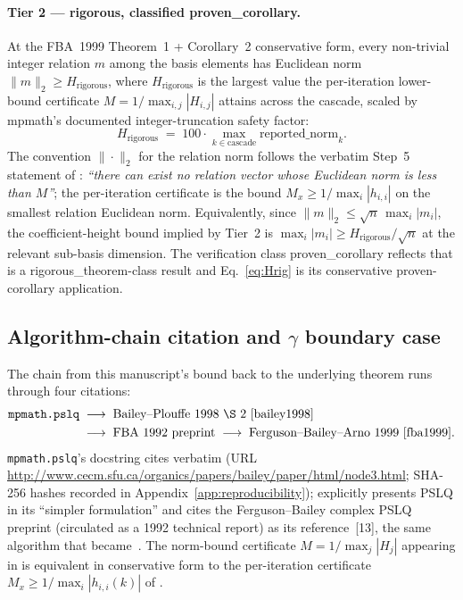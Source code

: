 \documentclass[11pt,a4paper]{article}
\newcommand{\Hrig}{H_{\mathrm{rigorous}}}
\newcommand{\pc}{\textsf{proven\_corollary}}
\newcommand{\rt}{\textsf{rigorous\_theorem}}
\begin{document}
\paragraph{Tier 2 --- rigorous, classified \pc{}.}
At the FBA~1999 Theorem~1 + Corollary~2 conservative form, every non-trivial
integer relation $m$ among the basis elements has Euclidean norm
$\|m\|_{2} \ge \Hrig$, where $\Hrig$ is the largest value the per-iteration
lower-bound certificate
$M = 1/\max_{i,j}|H_{i,j}|$
attains across the cascade, scaled by mpmath's documented
integer-truncation safety factor:
\begin{equation}\label{eq:Hrig}
  \Hrig \;=\; 100 \cdot \max_{k \in \mathrm{cascade}} \mathrm{reported\_norm}_{k}.
\end{equation}
The convention $\|\cdot\|_{2}$ for the relation norm follows the
verbatim Step~5 statement of \cite[\S 2]{bailey1998}:
\emph{``there can exist no relation vector whose Euclidean norm is less
than $M$''}; the per-iteration certificate is the
\cite[Theorem~1]{fba1999} bound $M_{x} \ge 1/\max_{i}|h_{i,i}|$ on the
smallest relation Euclidean norm.
Equivalently, since
$\|m\|_{2} \le \sqrt{n}\,\max_{i}|m_{i}|$,
the coefficient-height bound implied by Tier~2 is
$\max_{i}|m_{i}| \ge \Hrig/\sqrt{n}$ at the relevant sub-basis dimension.
The verification class \pc{} reflects that \cite[Theorem~1]{fba1999} is a
\rt{}-class result and Eq.~\eqref{eq:Hrig} is its conservative
proven-corollary application.

\subsection{Algorithm-chain citation and
   \texorpdfstring{{\boldmath$\gamma$}}{gamma} boundary
   case}\label{sec:algo-chain}

The chain from this manuscript's bound back to the underlying theorem
runs through four citations:
\begin{equation}\label{eq:chain}
\begin{aligned}
  \text{\texttt{mpmath.pslq}}
  &\;\longrightarrow\;
  \text{Bailey--Plouffe 1998 \S 2~\cite{bailey1998}} \\
  &\;\longrightarrow\;
  \text{FBA 1992 preprint}
  \;\longrightarrow\;
  \text{Ferguson--Bailey--Arno 1999~\cite{fba1999}}.
\end{aligned}
\end{equation}
\texttt{mpmath.pslq}'s docstring cites
\cite[\S 2]{bailey1998} verbatim
(URL
\url{http://www.cecm.sfu.ca/organics/papers/bailey/paper/html/node3.html};
SHA-256 hashes recorded in Appendix~\ref{app:reproducibility});
\cite[\S 2]{bailey1998} explicitly presents PSLQ in its
``simpler formulation'' and cites the Ferguson--Bailey complex PSLQ preprint
(circulated as a 1992 technical report) as its reference~[13],
the same algorithm that became~\cite{fba1999}.
The norm-bound certificate
$M = 1 / \max_{j} |H_{j}|$
appearing in \cite[\S 2 pseudocode step 5]{bailey1998}
is equivalent in conservative form to the per-iteration certificate
$M_{x} \ge 1 / \max_{i}|h_{i,i}(k)|$ of \cite[Theorem~1]{fba1999}.
\end{document}
